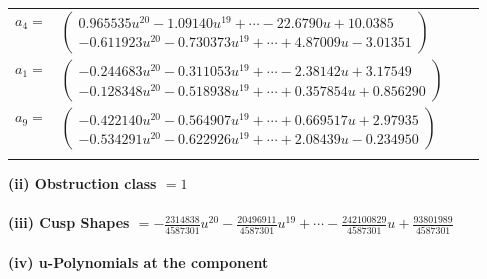 \documentclass[1p]{elsarticle_modified}
\theoremstyle{definition}
\begin{document}
\begin{tabular}{m{7pt} m{180pt} m{7pt} m{180pt} }
\flushright $a_{4}=$&$\begin{pmatrix}0.965535 u^{20}-1.09140 u^{19}+\cdots-22.6790 u+10.0385\\-0.611923 u^{20}-0.730373 u^{19}+\cdots+4.87009 u-3.01351\end{pmatrix}$ \\
\flushright $a_{1}=$&$\begin{pmatrix}-0.244683 u^{20}-0.311053 u^{19}+\cdots-2.38142 u+3.17549\\-0.128348 u^{20}-0.518938 u^{19}+\cdots+0.357854 u+0.856290\end{pmatrix}$ \\
\flushright $a_{9}=$&$\begin{pmatrix}-0.422140 u^{20}-0.564907 u^{19}+\cdots+0.669517 u+2.97935\\-0.534291 u^{20}-0.622926 u^{19}+\cdots+2.08439 u-0.234950\end{pmatrix}$\\&\end{tabular}
\flushleft \textbf{(ii) Obstruction class $= 1$}\\~\\
\flushleft \textbf{(iii) Cusp Shapes $= -\frac{2314838}{4587301} u^{20}-\frac{20496911}{4587301} u^{19}+\cdots-\frac{242100829}{4587301} u+\frac{93801989}{4587301}$}\\~\\
\newpage\renewcommand{\arraystretch}{1}
\flushleft \textbf{(iv) u-Polynomials at the component}\newline \\
\end{document}
